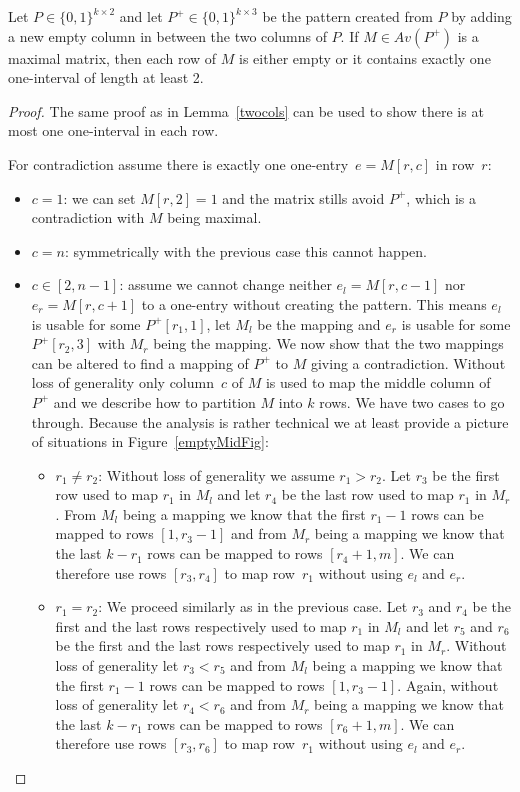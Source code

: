 \begin{lemma}
\label{lemmamax}
Let $P\in\{0,1\}^{k\times2}$ and let $P^+\in\{0,1\}^{k\times3}$ be the pattern created from $P$ by adding a new empty column in between the two columns of $P$. If $M\in Av(P^+)$ is a maximal matrix, then each row of $M$ is either empty or it contains exactly one one-interval of length at least 2.
\end{lemma}
\begin{proof}
The same proof as in Lemma~\ref{twocols} can be used to show there is at most one one-interval in each row.

For contradiction assume there is exactly one one-entry~$e=M[r,c]$ in row~$r$:
\begin{itemize}
	\item $c=1$: we can set $M[r,2]=1$ and the matrix stills avoid $P^+$, which is a contradiction with $M$ being maximal.
	\item $c=n$: symmetrically with the previous case this cannot happen.
	\item $c\in[2,n-1]$: assume we cannot change neither $e_l=M[r,c-1]$ nor $e_r=M[r,c+1]$ to a one-entry without creating the pattern. This means $e_l$ is usable for some $P^+[r_1,1]$, let $M_l$ be the mapping and $e_r$ is usable for some $P^+[r_2,3]$ with $M_r$ being the mapping. We now show that the two mappings can be altered to find a mapping of $P^+$ to $M$ giving a contradiction. Without loss of generality only column~$c$ of $M$ is used to map the middle column of $P^+$ and we describe how to partition $M$ into $k$ rows. We have two cases to go through. Because the analysis is rather technical we at least provide a picture of situations in Figure~\ref{emptyMidFig}:
	\begin{itemize}
		\item $r_1\neq r_2$: Without loss of generality we assume $r_1>r_2$. Let $r_3$ be the first row used to map $r_1$ in $M_l$ and let $r_4$ be the last row used to map $r_1$ in $M_r$. From $M_l$ being a mapping we know that the first $r_1-1$ rows can be mapped to rows $[1,r_3-1]$ and from $M_r$ being a mapping we know that the last $k-r_1$ rows can be mapped to rows $[r_4+1,m]$. We can therefore use rows $[r_3,r_4]$ to map row~$r_1$ without using $e_l$ and $e_r$.
		\item $r_1=r_2$: We proceed similarly as in the previous case. Let $r_3$ and $r_4$ be the first and the last rows respectively used to map $r_1$ in $M_l$ and let $r_5$ and $r_6$ be the first and the last rows respectively used to map $r_1$ in $M_r$. Without loss of generality let $r_3<r_5$ and from $M_l$ being a mapping we know that the first $r_1-1$ rows can be mapped to rows $[1,r_3-1]$. Again, without loss of generality let $r_4<r_6$ and from $M_r$ being a mapping we know that the last $k-r_1$ rows can be mapped to rows $[r_6+1,m]$. We can therefore use rows $[r_3,r_6]$ to map row~$r_1$ without using $e_l$ and $e_r$.
	\end{itemize}
\end{itemize}


\end{proof}
